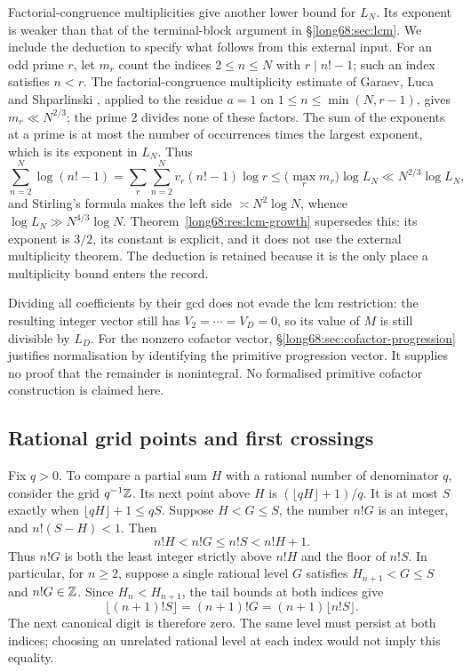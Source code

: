 \documentclass[11pt]{article}
\newcommand{\Ser}{S}
\newcommand{\Lc}{L}
\begin{document}
Factorial-congruence multiplicities give another lower bound for
$\Lc_N$. Its exponent is weaker than that of the terminal-block
argument in \S\ref{long68:sec:lcm}. We include the deduction to specify
what follows from this external input.
For an odd prime $r$, let $m_r$ count the
indices $2\le n\le N$ with $r\mid n!-1$; such an index satisfies $n<r$.  The
factorial-congruence multiplicity estimate of Garaev, Luca and Shparlinski
\cite[arXiv v1, Thm.~12, p.~16]{garaev-luca-shparlinski}, applied to the
residue $a=1$ on $1\le n\le\min(N,r-1)$, gives $m_r\ll N^{2/3}$; the prime $2$
divides none of
these factors. The sum of the exponents at a prime is at most the number
of occurrences times the largest exponent, which is its exponent in
$\Lc_N$. Thus
\[
 \sum_{n=2}^{N}\log(n!-1)=\sum_r\sum_{n=2}^{N}v_r(n!-1)\log r
 \le\bigl(\max_r m_r\bigr)\log\Lc_N
 \ll N^{2/3}\log \Lc_N ,
\]
and Stirling's formula makes the left side $\asymp N^2\log N$, whence
$\log \Lc_N\gg N^{4/3}\log N$.  Theorem~\ref{long68:res:lcm-growth} supersedes this:
its exponent is $3/2$, its constant is explicit, and it does not use the
external multiplicity theorem.  The deduction is retained because it is the only place a
multiplicity bound enters the record.

Dividing all coefficients by their gcd does not evade the lcm restriction:
the resulting integer vector still has $V_2=\cdots=V_D=0$, so its value of $M$
is still divisible by $L_D$. For the nonzero cofactor vector,
\S\ref{long68:sec:cofactor-progression} justifies normalisation by
identifying the primitive progression vector. It supplies no proof that the remainder is
nonintegral. No formalised primitive cofactor construction is claimed here.

\subsection{Rational grid points and first crossings}
\label{long68:sec:ext-plateau}

Fix $q>0$. To compare a partial sum $H$ with a rational number of
denominator $q$, consider the grid $q^{-1}\mathbb{Z}$. Its next point above $H$
is $(\lfloor qH\rfloor+1)/q$. It is at most $\Ser$ exactly when
$\lfloor qH\rfloor+1\le q\Ser$.  Suppose $H<G\le S$, the number $n!G$ is an integer, and
$n!(S-H)<1$. Then
\[
 n!H<n!G\le n!S<n!H+1.
\]
Thus $n!G$ is both the least integer strictly above $n!H$ and the floor of
$n!S$. In particular, for $n\ge2$, suppose a single rational level $G$
satisfies $H_{n+1}<G\le S$ and $n!G\in\mathbb{Z}$. Since $H_n<H_{n+1}$,
the tail bounds at both indices give
\[
 \lfloor(n+1)!S\rfloor=(n+1)!G
   =(n+1)\lfloor n!S\rfloor.
\]
The next canonical digit is therefore zero. The same level must persist
at both indices; choosing an unrelated rational level at each index
would not imply this equality.
\end{document}
